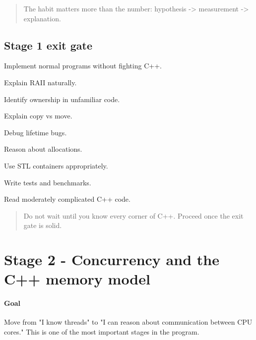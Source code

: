 \documentclass[11pt,letterpaper]{article}
\begin{document}
\begin{quote}
The habit matters more than the number: hypothesis -> measurement -> explanation.
\end{quote}

\subsection*{Stage 1 exit gate}

\begin{topics}

\item Implement normal programs without fighting C++.

\item Explain RAII naturally.

\item Identify ownership in unfamiliar code.

\item Explain copy vs move.

\item Debug lifetime bugs.

\item Reason about allocations.

\item Use STL containers appropriately.

\item Write tests and benchmarks.

\item Read moderately complicated C++ code.

\end{topics}

\begin{quote}
Do not wait until you know every corner of C++. Proceed once the exit gate is solid.
\end{quote}

\section{Stage 2 - Concurrency and the C++ memory model}\label{sec:6}

\label{stage:2}

\paragraph*{Goal}

Move from "I know threads" to "I can reason about communication between CPU cores." This is one of the most important stages in the program.
\end{document}
